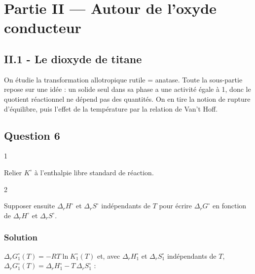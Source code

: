 \documentclass[11pt,a4paper]{article}
\newcommand{\equationajustee}[1]{%
  \sbox{\boiteequation}{$\displaystyle #1$}%
  \ifdim\wd\boiteequation>\linewidth
    \[\resizebox{\linewidth}{!}{\usebox{\boiteequation}}\]%
  \else
    \[#1\]%
  \fi}
\begin{document}
\hypertarget{partie-ii-autour-de-loxyde-conducteur}{%
\section{Partie II --- Autour de l'oxyde conducteur}\label{partie-ii-autour-de-loxyde-conducteur}}

\hypertarget{ii.1---le-dioxyde-de-titane}{%
\subsection{II.1 - Le dioxyde de titane}\label{ii.1---le-dioxyde-de-titane}}

On étudie la transformation allotropique rutile = anatase. Toute la sous-partie repose sur une idée : un solide seul dans sa phase a une activité égale à 1, donc le quotient réactionnel ne dépend pas des quantités. On en tire la notion de rupture d'équilibre, puis l'effet de la température par la relation de Van't Hoff.

\hypertarget{question-6}{%
\subsection{Question 6}\label{question-6}}

\begin{indication}{1}

Relier \(K^\circ\) à l'enthalpie libre standard de réaction.

\end{indication}

\begin{indication}{2}

Supposer ensuite \(\Delta_r H^\circ\) et \(\Delta_r S^\circ\) indépendants de \(T\) pour écrire \(\Delta_r G^\circ\) en fonction de \(\Delta_r H^\circ\) et \(\Delta_r S^\circ\).

\end{indication}

\hypertarget{solution-5}{%
\subsubsection{Solution}\label{solution-5}}

\(\Delta_r G^\circ_1(T) = -RT\ln K^\circ_1(T)\) et, avec \(\Delta_r H^\circ_1\) et \(\Delta_r S^\circ_1\) indépendants de \(T\), \(\Delta_r G^\circ_1(T) = \Delta_r H^\circ_1 - T\,\Delta_r S^\circ_1\) :

\equationajustee{\boxed{K^\circ_1(T) = \exp\left(\frac{\Delta_r S^\circ_1}{R} - \frac{\Delta_r H^\circ_1}{RT}\right)}}
\end{document}
